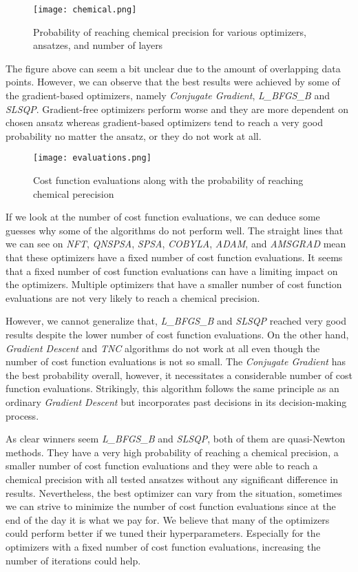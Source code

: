 \begin{figure}[H]
    \centering
    \texttt{[image: chemical.png]}
    \caption{Probability of reaching chemical precision for various optimizers, ansatzes, and number of layers}
    \label{fig:chemical}
\end{figure}

The figure above can seem a bit unclear due to the amount of overlapping data points. However, we can observe that the best results were achieved by some of the gradient-based optimizers, namely \textit{Conjugate Gradient}, \textit{L\_BFGS\_B} and \textit{SLSQP}. Gradient-free optimizers perform worse and they are more dependent on chosen ansatz whereas gradient-based optimizers tend to reach a very good probability no matter the ansatz, or they do not work at all. 

\begin{figure}[H]
    \centering
    \texttt{[image: evaluations.png]}
    \caption{Cost function evaluations along with the probability of reaching chemical perecision}
    \label{fig:evaluations}
\end{figure}

If we look at the number of cost function evaluations, we can deduce some guesses why some of the algorithms do not perform well. The straight lines that we can see on \textit{NFT}, \textit{QNSPSA}, \textit{SPSA}, \textit{COBYLA}, \textit{ADAM}, and \textit{AMSGRAD} mean that these optimizers have a fixed number of cost function evaluations. It seems that a fixed number of cost function evaluations can have a limiting impact on the optimizers. Multiple optimizers that have a smaller number of cost function evaluations are not very likely to reach a chemical precision.

However, we cannot generalize that, \textit{L\_BFGS\_B} and \textit{SLSQP} reached very good results despite the lower number of cost function evaluations. On the other hand, \textit{Gradient Descent} and \textit{TNC} algorithms do not work at all even though the number of cost function evaluations is not so small. The \textit{Conjugate Gradient} has the best probability overall, however, it necessitates a considerable number of cost function evaluations. Strikingly, this algorithm follows the same principle as an ordinary \textit{Gradient Descent} but incorporates past decisions in its decision-making process.

As clear winners seem \textit{L\_BFGS\_B} and \textit{SLSQP}, both of them are quasi-Newton methods. They have a very high probability of reaching a chemical precision, a smaller number of cost function evaluations and they were able to reach a chemical precision with all tested ansatzes without any significant difference in results. Nevertheless, the best optimizer can vary from the situation, sometimes we can strive to minimize the number of cost function evaluations since at the end of the day it is what we pay for. We believe that many of the optimizers could perform better if we tuned their hyperparameters. Especially for the optimizers with a fixed number of cost function evaluations, increasing the number of iterations could help.